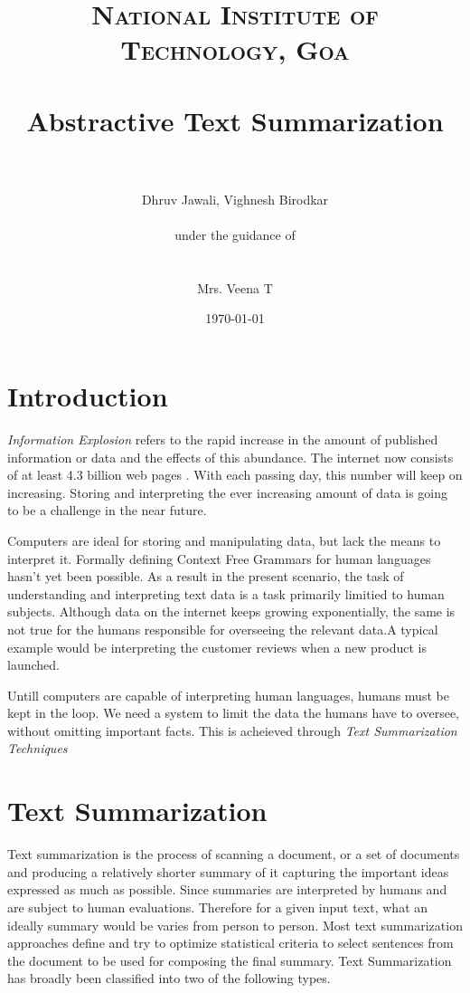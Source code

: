 \documentclass[paper=a4, fontsize=11pt]{scrartcl} %
\title{	
\normalfont \normalsize 
\textsc{National Institute of Technology, Goa} \\ [25pt] %
\horrule{0.5pt} \\[0.4cm] %
\huge Abstractive Text Summarization \\ %
\horrule{2pt} \\[0.5cm] %
}
\author{Dhruv Jawali, Vighnesh Birodkar \\
\\
\small{under the guidance of} \\
\\
\\
Mrs. Veena T
} %
\date{\normalsize\today} %
\numberwithin{equation}{section} %
\numberwithin{figure}{section} %
\numberwithin{table}{section} %
\begin{document}
\maketitle %
\pagebreak
\tableofcontents
\pagebreak




\section{Introduction}
\emph{Information Explosion} \cite{fshock} refers to the rapid increase in the amount of published information or data and the effects of this abundance. The internet now consists of at least 4.3 billion web pages \cite{websize}. With each passing day, this number will keep on increasing. Storing and interpreting the ever increasing amount of data is going to be a challenge in the near future.\\
\par
Computers are ideal for storing and manipulating data, but lack the means to interpret it. Formally defining Context Free Grammars for human languages hasn't yet been possible. As a result in the present scenario, the task of understanding and interpreting text data is a task primarily limitied to human subjects. Although data on the internet keeps growing exponentially, the same is not true for the humans responsible for overseeing the relevant data.A typical example would be interpreting the customer reviews when a new product is launched.\\
\par
Untill computers are capable of interpreting human languages, humans must be kept in the loop. We need a system to limit the data the humans have to oversee, without omitting important facts. This is acheieved through \emph{Text Summarization Techniques}
\section{Text Summarization}
Text summarization is the process of scanning a document, or a set of documents and producing a relatively shorter summary of it capturing the important ideas expressed as much as possible. Since summaries are interpreted by humans and are subject to human evaluations. Therefore for a given input text, what an ideally summary would be varies from person to person. Most text summarization approaches define and try to optimize statistical criteria to select sentences from the document to be used for composing the final summary.%
Text Summarization has broadly been classified into two of the following types. %
\end{document}
